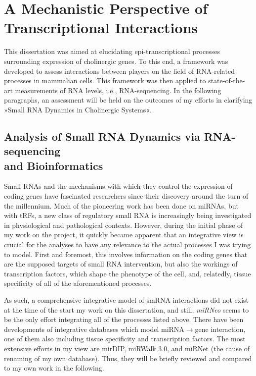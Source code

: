 \section[A Mechanistic Perspective of Transcriptional Interactions]{A Mechanistic Perspective of \\Transcriptional Interactions}

This dissertation was aimed at elucidating epi-transcriptional processes surrounding expression of cholinergic genes. To this end, a framework was developed to assess interactions between players on the field of RNA-related processes in mammalian cells. This framework was then applied to state-of-the-art measurements of RNA levels, i.e., RNA-sequencing. In the following paragraphs, an assessment will be held on the outcomes of my efforts in clarifying »Small RNA Dynamics in Cholinergic Systems«.

\subsection{Analysis of Small RNA Dynamics via RNA-sequencing \\and Bioinformatics}
Small RNAs and the mechanisms with which they control the expression of coding genes have fascinated researchers since their discovery around the turn of the millennium. Much of the pioneering work has been done on miRNAs, but with tRFs, a new class of regulatory small RNA is increasingly being investigated in physiological and pathological contexts. However, during the initial phase of my work on the project, it quickly became apparent that an integrative view is crucial for the analyses to have any relevance to the actual processes I was trying to model. First and foremost, this involves information on the coding genes that are the supposed targets of small RNA intervention, but also the workings of transcription factors, which shape the phenotype of the cell, and, relatedly, tissue specificity of all of the aforementioned processes.

As such, a comprehensive integrative model of smRNA interactions did not exist at the time of the start my work on this dissertation, and still, \emph{miRNeo} seems to be the only effort integrating all of the processes listed above. There have been developments of integrative databases which model miRNA$\to$gene interaction, one of them also including tissue specificity and transcription factors. The most extensive efforts in my view are mirDIP, miRWalk 3.0, and miRNet (the cause of renaming of my own database). Thus, they will be briefly reviewed and compared to my own work in the following.

